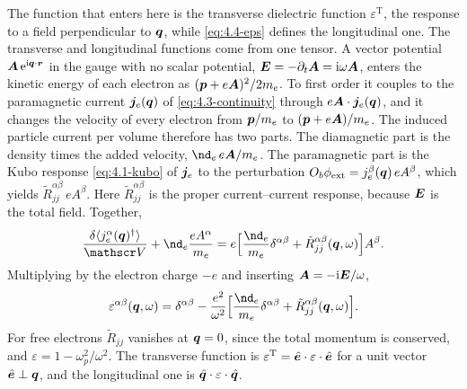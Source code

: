 The function that enters here is the transverse dielectric function $\varepsilon^{\mathrm{T}}$, the response to a field perpendicular to $\bm{q}$, while \cref{eq:4.4-eps} defines the longitudinal one. The transverse and longitudinal functions come from one tensor. A vector potential $\bm{A}\,\mathrm{e}^{\mathrm{i}\bm{q}\cdot\bm{r}}$ in the gauge with no scalar potential, $\bm{E} = -\partial_t\bm{A} = \mathrm{i}\omega\bm{A}$, enters the kinetic energy of each electron as $(\bm{p} + e\bm{A})^2/2m_e$. To first order it couples to the paramagnetic current $\bm{j}_e(\bm{q})$ of \cref{eq:4.3-continuity} through $e\bm{A}\cdot\bm{j}_e(\bm{q})$, and it changes the velocity of every electron from $\bm{p}/m_e$ to $(\bm{p} + e\bm{A})/m_e$. The induced particle current per volume therefore has two parts. The diamagnetic part is the density times the added velocity, $\nd_e\,e\vect{A}/m_e$. The paramagnetic part is the Kubo response \cref{eq:4.1-kubo} of $\bm{j}_e$ to the perturbation $O_b\phi_{\mathrm{ext}} = j_e^\beta(\bm{q})\,eA^\beta$, which yields $\tilde R^{\alpha\beta}_{jj}\,eA^\beta$. Here $\tilde R^{\alpha\beta}_{jj}$ is the proper current--current response, because $\bm{E}$ is the total field. Together,
\begin{equation*}
  \frac{\delta\langle j_e^\alpha(\vect{q})^\dagger\rangle}{\Vol} + \nd_e\frac{eA^\alpha}{m_e} = e\Bigl[\frac{\nd_e}{m_e}\delta^{\alpha\beta} + \tilde R^{\alpha\beta}_{jj}(\vect{q},\omega)\Bigr]A^\beta .
\end{equation*} Multiplying by the electron charge $-e$ and inserting $\bm{A} = -\mathrm{i}\bm{E}/\omega$,
\begin{equation*}
  \varepsilon^{\alpha\beta}(\vect{q},\omega) = \delta^{\alpha\beta} - \frac{e^2}{\omega^2}\Bigl[\frac{\nd_e}{m_e}\delta^{\alpha\beta} + \tilde R^{\alpha\beta}_{jj}(\vect{q},\omega)\Bigr] .
\end{equation*}
For free electrons $\tilde R_{jj}$ vanishes at $\bm{q} = 0$, since the total momentum is conserved, and $\varepsilon = 1 - \omega_p^2/\omega^2$. The transverse function is $\varepsilon^{\mathrm{T}} = \hat{\bm{e}}\cdot\varepsilon\cdot\hat{\bm{e}}$ for a unit vector $\hat{\bm{e}} \perp \bm{q}$, and the longitudinal one is $\hat{\bm{q}}\cdot\varepsilon\cdot\hat{\bm{q}}$.

